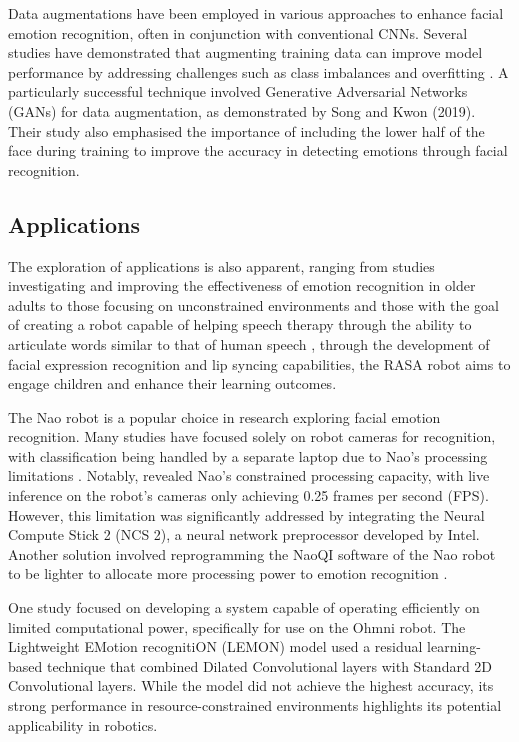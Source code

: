 Data augmentations have been employed in various approaches to enhance facial emotion recognition, often in conjunction with conventional CNNs. Several studies have demonstrated that augmenting training data can improve model performance by addressing challenges such as class imbalances and overfitting \cite{Saxena2022-sr} \cite{Ruiz-Garcia2018-uy}. A particularly successful technique involved Generative Adversarial Networks (GANs) for data augmentation, as demonstrated by Song and Kwon (2019). Their study also emphasised the importance of including the lower half of the face during training to improve the accuracy in detecting emotions through facial recognition.

\subsection{Applications}

The exploration of applications is also apparent, ranging from studies investigating and improving the effectiveness of emotion recognition in older adults \cite{Ma2019-ng} to those focusing on unconstrained environments \cite{Webb2020-bq} and those with the goal of creating a robot capable of helping speech therapy through the ability to articulate words similar to that of human speech \cite{Esfandbod2023-eq}, through the development of facial expression recognition and lip syncing capabilities, the RASA robot aims to engage children and enhance their learning outcomes.

The Nao robot is a popular choice in research exploring facial emotion recognition. Many studies have focused solely on robot cameras for recognition, with classification being handled by a separate laptop due to Nao's processing limitations \cite{Ruiz-Garcia2018-zq}. Notably, \cite{Melinte2020-ky} revealed Nao's constrained processing capacity, with live inference on the robot's cameras only achieving 0.25 frames per second (FPS). However, this limitation was significantly addressed by integrating the Neural Compute Stick 2 (NCS 2), a neural network preprocessor developed by Intel. Another solution involved reprogramming the NaoQI software of the Nao robot to be lighter to allocate more processing power to emotion recognition \cite{Lopez-Rincon2019-et}.

One study focused on developing a system capable of operating efficiently on limited computational power, specifically for use on the Ohmni robot. The Lightweight EMotion recognitiON (LEMON) model \cite{Devaram2022-qc} used a residual learning-based technique that combined Dilated Convolutional layers with Standard 2D Convolutional layers. While the model did not achieve the highest accuracy, its strong performance in resource-constrained environments highlights its potential applicability in robotics.

